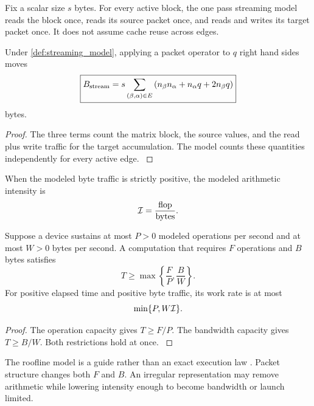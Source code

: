 \begin{definition}\label{main:definition:007}\label{def:streaming_model}
Fix a scalar size \(s\) bytes. For every active block, the one pass streaming model reads the block once, reads its source packet once, and reads and writes its target packet once. It does not assume cache reuse across edges.
\end{definition}

\begin{proposition}\label{main:proposition:002}\label{prop:streaming_bytes}
Under \cref{def:streaming_model}, applying a packet operator to \(q\) right hand sides moves
\[
\boxed{
B_{\rm stream}
=
s
\sum_{(\beta,\alpha)\in E}
\left(
 n_\beta n_\alpha
 +n_\alpha q
 +2n_\beta q
\right)
}
\]
bytes.
\end{proposition}

\begin{proof}\label{main:proof:008}
The three terms count the matrix block, the source values, and the read plus write traffic for the target accumulation. The model counts these quantities independently for every active edge.
\label{main:proof:008:end}\end{proof}

\begin{definition}\label{main:definition:008}\label{def:intensity}
When the modeled byte traffic is strictly positive, the modeled arithmetic intensity is
\[
\Ical
=
\frac{\flop}{\bytes}.
\]
\end{definition}

\begin{theorem}\label{main:theorem:005}\label{thm:roofline}
Suppose a device sustains at most $P>0$ modeled operations per second and at most $W>0$ bytes per second. A computation that requires \(F\) operations and \(B\) bytes satisfies
\[
\boxed{
T\geq
\max\left\{
\frac{F}{P},
\frac{B}{W}
\right\}.
}
\]
For positive elapsed time and positive byte traffic, its work rate is at most
\[
\min\{P,W\Ical\}.
\]
\end{theorem}

\begin{proof}\label{main:proof:009}
The operation capacity gives \(T\geq F/P\). The bandwidth capacity gives \(T\geq B/W\). Both restrictions hold at once.
\label{main:proof:009:end}\end{proof}

The roofline model is a guide rather than an exact execution law \cite{WilliamsWatermanPatterson2009}. Packet structure changes both \(F\) and \(B\). An irregular representation may remove arithmetic while lowering intensity enough to become bandwidth or launch limited.

